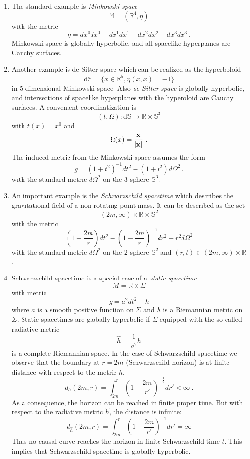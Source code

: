 \documentclass[12pt]{article}
\newcommand{\dS}{\mathrm{d}\mathbb{S}}
\newcommand{\x}{{\bf x}}
\newcommand{\RR}{\mathbb{R}}           %
\newcommand{\1}{\mathds{1}}                         %
\begin{document}
\begin{enumerate}
\item 
The standard example is \textit{Minkowski space}
\[\mathbb{M}=(\RR^4,\eta)\]
with the metric
\[\eta=dx^0dx^0-dx^1dx^1-dx^2dx^2-dx^3dx^3 \ .\]
Minkowski space is globally hyperbolic, and all spacelike hyperplanes are Cauchy surfaces.
\item
Another example is de Sitter space which can be realized as the hyperboloid
\[\mathrm d\mathbb{S}=\{x\in\mathbb R^5, \eta(x,x)=-1\}\]
in 5 dimensional Minkowski space. Also \textit{de Sitter space} is globally hyperbolic, and intersections of spacelike hyperplanes with the hyperoloid are Cauchy surfaces.
A convenient coordinatization is
\[(t,\Omega):\dS\to \RR\times\mathbb{S}^3\] 
with $t(x)=x^0$ and 
\[\Omega(x)=\frac{\x}{|\x|} \ .\]
The induced metric from the Minkowski space assumes the form
\[g=(1+t^2)^{-1}dt^2-(1+t^2)d\Omega^2\ .\]
with the standard metric $d\Omega^2$ on the 3-sphere $\mathbb{S}^3$.
\item An important example is the \textit{Schwarzschild spacetime} which describes the gravitational field of a non rotating point mass.
It can be described as the set
\[(2m,\infty)\times\RR\times \mathbb{S}^2\]
with the metric
\[\left(1-\frac{2m}{r}\right)dt^2-\left(1-\frac{2m}{r}\right)^{-1}dr^2-r^2d\Omega^2\]
with the standard metric $d\Omega^2$ on the 2-sphere $\mathbb{S}^2$ and $(r,t)\in(2m,\infty)\times\RR$.
\item Schwarzschild spacetime is a special case of a \textit{static spacetime}
\[M=\mathbb{R}\times \Sigma\]
with metric
\[g=a^2dt^2-h\]
where $a$ is a smooth positive function on $\Sigma$ and $h$ is a Riemannian metric on $\Sigma$. Static spacetimes are globally hyperbolic if $\Sigma$ equipped with the so called radiative metric
\[\hat{h}=\frac{1}{a^2}h\]
is a complete Riemannian space. In the case of Schwarzschild spacetime we observe that the boundary at $r=2m$ (Schwarzschild horizon) is at finite distance with respect to the metric $h$,
\[d_h(2m,r)=\int_{2m}^r \left(1-\frac{2m}{r'}\right)^{-\frac12}dr'<\infty\ .\]
{As a consequence, the horizon can be reached in finite proper time.}
But with respect to the radiative metric $\hat h$, the distance is infinite:
\[d_{\hat h}(2m,r)=\int_{2m}^r\left(1-\frac{2m}{r'}\right)^{-1}dr'=\infty\]
{Thus no causal curve reaches the horizon in finite Schwarzschild time $t$. This implies that Schwarzschild spacetime is globally hyperbolic.}


\end{enumerate}
\end{document}
